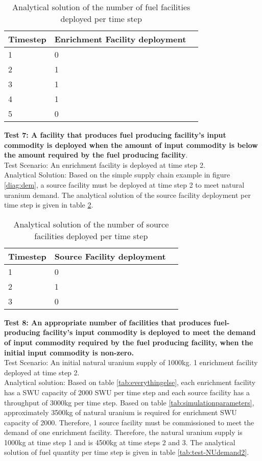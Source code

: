 \documentclass[11pt,letterpaper]{article}
\begin{document}
\begin{table}[H]
     \centering
    \begin{tabularx}{\textwidth}{bbb}
       \hline
       Timestep & Enrichment Facility deployment \\
       \hline
       1 & 0 \\
       2 & 1 \\
       3 & 1 \\
       4 & 1 \\
       5 & 0 \\
       \hline
    \end{tabularx}
    \caption {Analytical solution of the number of fuel facilities deployed per time step}
    \label{tab:test-supplymoredemand}
\end{table}

\noindent
\textbf{Test 7: A facility that produces fuel producing facility's input commodity is deployed when the amount of input commodity is below the amount required by the fuel producing facility}. \\
Test Scenario: An enrichment facility is deployed at time step 2. \\
Analytical Solution: Based on the simple supply chain example in
figure \ref{diag:dem}, a source facility must be deployed at time step 2 to meet natural uranium demand. The analytical solution of the source facility deployment per time step is given in table \ref{tab:test-NUdemand}. 

\begin{table}[H]
     \centering
    \begin{tabularx}{\textwidth}{bbb}
       \hline
       Timestep & Source Facility deployment  \\
       \hline
       1 & 0 \\
       2 & 1 \\
       3 & 0 \\
       \hline
    \end{tabularx}
    \caption {Analytical solution of the number of source facilities deployed per time step}
    \label{tab:test-NUdemand}
\end{table}

\noindent
\textbf{Test 8: An appropriate number of facilities that produces fuel-producing facility's input commodity is deployed to meet the demand of input commodity required by the fuel producing facility, when the initial input commodity is non-zero.} \\
Test Scenario: An initial natural uranium supply of 1000kg. 1 enrichment facility deployed at time step 2. \\
Analytical solution: Based on table \ref{tab:everythingelse}, each enrichment facility has a SWU capacity of 2000 SWU per time step and each source facility has a throughput of 3000kg per time step. Based on table \ref{tab:simulationparameters}, approximately 3500kg of natural uranium is required for enrichment SWU capacity of 2000. Therefore, 1 source facility must be commissioned to meet the demand of one enrichment facility. Therefore, the natural uranium supply is 1000kg at time step 1 and is 4500kg at time steps 2 and 3. The analytical solution of fuel quantity per time step is given in table \ref{tab:test-NUdemand2}.  
\end{document}
